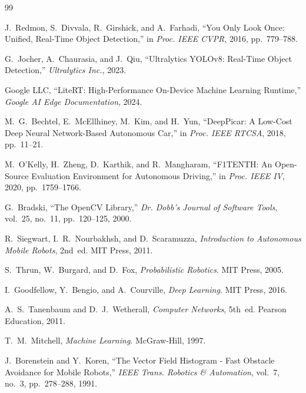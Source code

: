 \begingroup
\small
\setlength{\itemsep}{1pt}
\begin{thebibliography}{99}

J.~Redmon, S.~Divvala, R.~Girshick, and A.~Farhadi, ``You Only Look Once: Unified, Real-Time Object Detection,'' in \emph{Proc. IEEE CVPR}, 2016, pp.~779--788.

G.~Jocher, A.~Chaurasia, and J.~Qiu, ``Ultralytics YOLOv8: Real-Time Object Detection,'' \emph{Ultralytics Inc.}, 2023.

Google LLC, ``LiteRT: High-Performance On-Device Machine Learning Runtime,'' \emph{Google AI Edge Documentation}, 2024.

M.~G.~Bechtel, E.~McEllhiney, M.~Kim, and H.~Yun, ``DeepPicar: A Low-Cost Deep Neural Network-Based Autonomous Car,'' in \emph{Proc. IEEE RTCSA}, 2018, pp.~11--21.

M.~O'Kelly, H.~Zheng, D.~Karthik, and R.~Mangharam, ``F1TENTH: An Open-Source Evaluation Environment for Autonomous Driving,'' in \emph{Proc. IEEE IV}, 2020, pp.~1759--1766.

G.~Bradski, ``The OpenCV Library,'' \emph{Dr. Dobb's Journal of Software Tools}, vol.~25, no.~11, pp.~120--125, 2000.

R.~Siegwart, I.~R.~Nourbakhsh, and D.~Scaramuzza, \emph{Introduction to Autonomous Mobile Robots}, 2nd~ed. MIT Press, 2011.

S.~Thrun, W.~Burgard, and D.~Fox, \emph{Probabilistic Robotics}. MIT Press, 2005.

I.~Goodfellow, Y.~Bengio, and A.~Courville, \emph{Deep Learning}. MIT Press, 2016.

A.~S.~Tanenbaum and D.~J.~Wetherall, \emph{Computer Networks}, 5th~ed. Pearson Education, 2011.

T.~M.~Mitchell, \emph{Machine Learning}. McGraw-Hill, 1997.

J.~Borenstein and Y.~Koren, ``The Vector Field Histogram - Fast Obstacle Avoidance for Mobile Robots,'' \emph{IEEE Trans. Robotics \& Automation}, vol.~7, no.~3, pp.~278--288, 1991.

\end{thebibliography}
\endgroup
